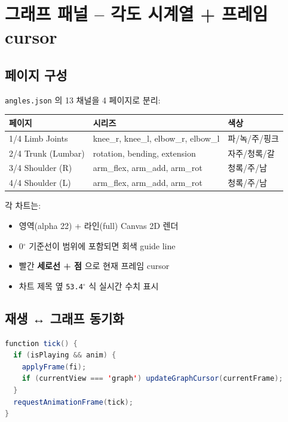 \documentclass[11pt, a4paper]{report}
\begin{document}
\chapter{그래프 패널 -- 각도 시계열 + 프레임 cursor}

\section{페이지 구성}

\texttt{angles.json} 의 13 채널을 4 페이지로 분리:

\begin{center}
\small
\begin{tabular}{l|l|l}
\toprule
\textbf{페이지} & \textbf{시리즈} & \textbf{색상} \\
\midrule
1/4 Limb Joints & knee\_r, knee\_l, elbow\_r, elbow\_l & 파/녹/주/핑크 \\
2/4 Trunk (Lumbar) & rotation, bending, extension & 자주/청록/갈 \\
3/4 Shoulder (R) & arm\_flex, arm\_add, arm\_rot & 청록/주/남 \\
4/4 Shoulder (L) & arm\_flex, arm\_add, arm\_rot & 청록/주/남 \\
\bottomrule
\end{tabular}
\end{center}

각 차트는:
\begin{itemize}
  \item 영역(alpha 22) + 라인(full) Canvas 2D 렌더
  \item 0$^\circ$ 기준선이 범위에 포함되면 회색 guide line
  \item 빨간 \textbf{세로선 + 점} 으로 현재 프레임 cursor
  \item 차트 제목 옆 \texttt{53.4$^\circ$} 식 실시간 수치 표시
\end{itemize}

\section{재생 ↔ 그래프 동기화}

\begin{lstlisting}[language=Java, caption={그래프 cursor 동기 (JS 유사)}]
function tick() {
  if (isPlaying && anim) {
    applyFrame(fi);
    if (currentView === 'graph') updateGraphCursor(currentFrame);
  }
  requestAnimationFrame(tick);
}
\end{lstlisting}
\end{document}
